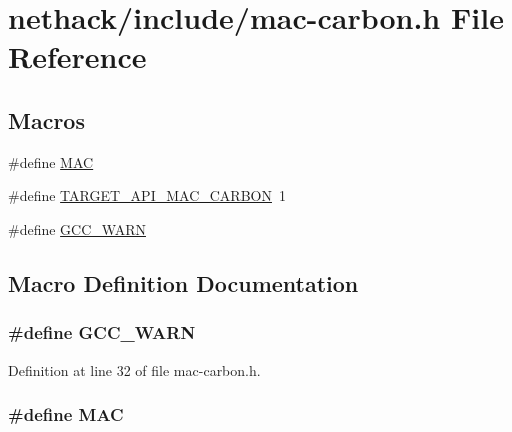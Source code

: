 \hypertarget{mac-carbon_8h}{\section{nethack/include/mac-\/carbon.h File Reference}
\label{mac-carbon_8h}
}
\subsection*{Macros}
\begin{DoxyCompactItemize}
\item 
\#define \hyperlink{mac-carbon_8h_a4d942614e0ca30372d649e643d229f90}{M\+A\+C}
\item 
\#define \hyperlink{mac-carbon_8h_a8601b9b36b5d7d40e6d42c0e04dd936c}{T\+A\+R\+G\+E\+T\+\_\+\+A\+P\+I\+\_\+\+M\+A\+C\+\_\+\+C\+A\+R\+B\+O\+N}~1
\item 
\#define \hyperlink{mac-carbon_8h_a92b0d5b27a6885d223fdad4315cc49c1}{G\+C\+C\+\_\+\+W\+A\+R\+N}
\end{DoxyCompactItemize}


\subsection{Macro Definition Documentation}
\hypertarget{mac-carbon_8h_a92b0d5b27a6885d223fdad4315cc49c1}{
\subsubsection[{G\+C\+C\+\_\+\+W\+A\+R\+N}]{\setlength{\rightskip}{0pt plus 5cm}\#define G\+C\+C\+\_\+\+W\+A\+R\+N}}\label{mac-carbon_8h_a92b0d5b27a6885d223fdad4315cc49c1}


Definition at line 32 of file mac-\/carbon.\+h.

\hypertarget{mac-carbon_8h_a4d942614e0ca30372d649e643d229f90}{
\subsubsection[{M\+A\+C}]{\setlength{\rightskip}{0pt plus 5cm}\#define M\+A\+C}}\label{mac-carbon_8h_a4d942614e0ca30372d649e643d229f90}


